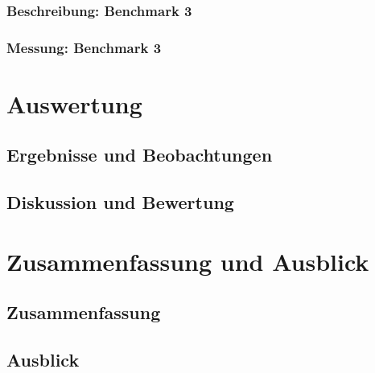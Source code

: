 \documentclass[fontsize=12pt,paper=a4,twoside=semi,parskip=half-,headsepline,headinclude]{scrreprt}
\begin{document}
\subsection{Beschreibung: Benchmark 3}

\subsection{Messung: Benchmark 3}


\chapter{Auswertung}

\section{Ergebnisse und Beobachtungen}

\section{Diskussion und Bewertung}



\chapter{Zusammenfassung und Ausblick}

\section{Zusammenfassung}

\section{Ausblick}



\printbibliography


%
%
%
%
%
%
%
\end{document}
